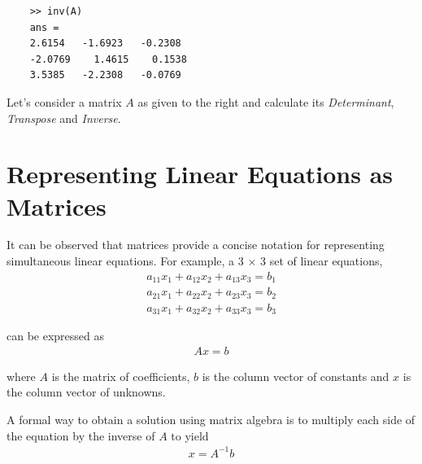 \documentclass[book.tex]{subfiles}
\begin{document}
\begin{margintable}
	\begin{verbatim}	
	>> inv(A)	
	ans =	
	2.6154   -1.6923   -0.2308
	-2.0769    1.4615    0.1538
	3.5385   -2.2308   -0.0769
	\end{verbatim}
\end{margintable}

Let's consider a matrix $A$ as given to the right and calculate its \textit{Determinant}, \textit{Transpose} and \textit{Inverse}. %

\section{Representing Linear Equations as Matrices}
It can be observed that matrices provide a concise notation for representing simultaneous linear equations. For example, a 3 $\times$ 3 set of linear equations,
\begin{align}
a_{11}x_1 + a_{12}x_2 + a_{13}x_3 = b_1\\
a_{21}x_1 + a_{22}x_2 + a_{23}x_3 = b_2\\
a_{31}x_1 + a_{32}x_2 + a_{33}x_3 = b_3
\end{align}

can be expressed as 
\begin{align}
Ax = b
\end{align}

where $A$ is the matrix of coefficients, $b$ is the column vector of constants and $x$ is the column vector of unknowns.

A formal way to obtain a solution using matrix algebra is to multiply each side of the equation by the inverse of $A$ to yield
\begin{align}
x = A^{-1}b
\end{align}
\end{document}
